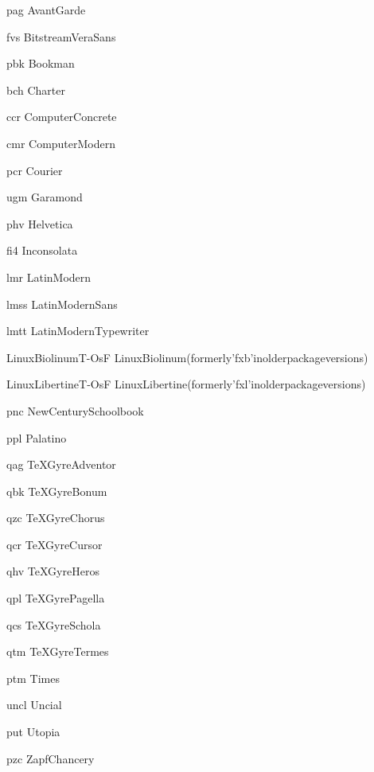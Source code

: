 \documentclass[12pt,A4]{article}
\begin{document}
pag {\selectfont AvantGarde}

fvs {\selectfont BitstreamVeraSans}

pbk {\selectfont Bookman}

bch {\selectfont Charter}

ccr {\selectfont ComputerConcrete}

cmr {\selectfont ComputerModern}

pcr {\selectfont Courier}

ugm {\selectfont Garamond}

phv {\selectfont Helvetica}

fi4 {\selectfont Inconsolata}

lmr {\selectfont LatinModern}

lmss {\selectfont LatinModernSans}

lmtt {\selectfont LatinModernTypewriter}

LinuxBiolinumT-OsF {\selectfont LinuxBiolinum(formerly'fxb'inolderpackageversions)}

LinuxLibertineT-OsF {\selectfont LinuxLibertine(formerly'fxl'inolderpackageversions)}

pnc {\selectfont NewCenturySchoolbook}

ppl {\selectfont Palatino}

qag {\selectfont TeXGyreAdventor}

qbk {\selectfont TeXGyreBonum}

qzc {\selectfont TeXGyreChorus}

qcr {\selectfont TeXGyreCursor}

qhv {\selectfont TeXGyreHeros}

qpl {\selectfont TeXGyrePagella}

qcs {\selectfont TeXGyreSchola}

qtm {\selectfont TeXGyreTermes}

ptm {\selectfont Times}

uncl {\selectfont Uncial}

put {\selectfont Utopia}

pzc {\selectfont ZapfChancery}
\end{document}

